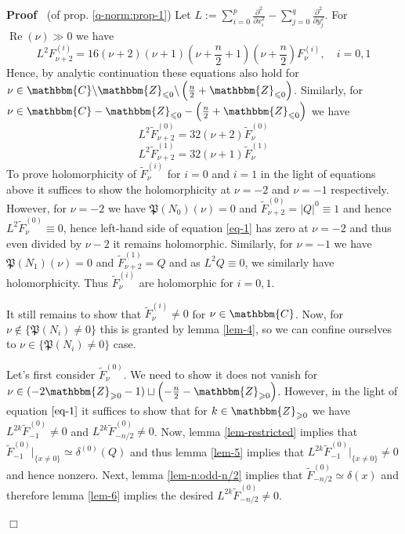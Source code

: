 \documentclass{article}
\newcommand{\assign}{:=}
\newcommand{\nin}{\not\in}
\newcommand{\tmop}[1]{\ensuremath{\operatorname{#1}}}
\newenvironment{proof}{\noindent\textbf{Proof\ }}{\hspace*{\fill}$\Box$\medskip}
\numberwithin{definition}{section}
\numberwithin{lemma}{section}
\numberwithin{proposition}{section}
{\theorembodyfont{\rmfamily}\newtheorem{remark}{Remark}
\numberwithin{remark}{section}
}
\begin{document}
\begin{proof}
  (of prop. \ref{q-norm:prop-1}) Let $L \assign \sum_{i = 0}^p
  \frac{\partial^2}{\partial x_i^2} - \sum_{j = 0}^q
  \frac{\partial^2}{\partial y_j^2}$. For $\tmop{Re} ( \nu) \gg 0$ we have
  \[ L^2 F_{\nu + 2}^{( i)} = 16 ( \nu + 2) ( \nu + 1) \left( \nu +
     \frac{n}{2} + 1 \right) \left( \nu + \frac{n}{2} \right) F_{\nu}^{( i)},
     \hspace{1em} i = 0, 1 \]
  Hence, by analytic continuation these equations also hold for $\nu \in
  \mathbbm{C}\backslash\mathbbm{Z}_{\leqslant 0} \backslash \left( \frac{n}{2}
  +\mathbbm{Z}_{\leqslant 0} \right)$. Similarly, for $\nu \in
  \mathbbm{C}-\mathbbm{Z}_{\leqslant 0} - \left( \frac{n}{2}
  +\mathbbm{Z}_{\leqslant 0} \right)$ we have
  \begin{equation}
    L^2 \tilde{F}^{( 0)}_{\nu + 2} = 32 ( \nu + 2) \tilde{F}_{\nu}^{( 0)}
    \label{eq-1}
  \end{equation}
  \begin{equation}
    L^2 \tilde{F}^{( 1)}_{\nu + 2} = 32 ( \nu + 1) \tilde{F}_{\nu}^{( 1)}
    \label{eq-2}
  \end{equation}
  To prove holomorphicity of $\tilde{F}_{\nu}^{( i)}$ for $i = 0$ and $i = 1$
  in the light of equations above it suffices to show the holomorphicity at
  $\nu = - 2$ and $\nu = - 1$ respectively. However, for $\nu = - 2$ we have
  $\mathfrak{P} ( N_0) ( \nu) = 0$ and $\tilde{F}_{\nu + 2}^{( 0)} = | Q |^0
  \equiv 1$ and hence $L^2 \tilde{F}^{( 0)}_{\nu} \equiv 0$, hence left-hand
  side of equation \ref{eq-1} has zero at $\nu = - 2$ and thus even divided by
  $\nu - 2$ it remains holomorphic. Similarly, for $\nu = - 1$ we have
  $\mathfrak{P} ( N_1) ( \nu) = 0$ and $\tilde{F}_{\nu + 2}^{( 1)} = Q$ and as
  $L^2 Q \equiv 0$, we similarly have holomorphicity. Thus $\tilde{F}_{\nu}^{(
  i)}$ are holomorphic for $i = 0, 1$.
  
  It still remains to show that $\tilde{F}^{( i)}_{\nu} \neq 0$ for $\nu \in
  \mathbbm{C}$. Now, for $\nu \nin \{ \mathfrak{P} ( N_i) \neq 0 \}$ this is
  granted by lemma \ref{lem-4}, so we can confine ourselves to $\nu \in \{
  \mathfrak{P} ( N_i) \neq 0 \}$ case.
  
  Let's first consider $\tilde{F}_{\nu}^{( 0)}$. We need to show it does not
  vanish for $\nu \in ( - 2\mathbbm{Z}_{\geqslant 0} - 1) \sqcup \left( -
  \frac{n}{2} -\mathbbm{Z}_{\geqslant 0} \right)$. However, in the light of
  equation $\ref{eq-1}$ it suffices to show that for $k \in
  \mathbbm{Z}_{\geqslant 0}$ we have $L^{2 k} \tilde{F}_{- 1}^{( 0)} \neq 0$
  and $L^{2 k} \tilde{F}_{- n / 2}^{( 0)} \neq 0$. Now, lemma
  \ref{lem-restricted} implies that $\tilde{F}_{- 1}^{( 0)} |_{\{ x \neq 0 \}}
  \simeq \delta^{( 0)} ( Q)$ and thus lemma \ref{lem-5} implies that $L^{2 k}
  \tilde{F}_{- 1}^{( 0)} |_{\{ x \neq 0 \}} \neq 0$ and hence nonzero. Next,
  lemma \ref{lem-n:odd-n/2} implies that $\tilde{F}_{- n / 2}^{( 0)} \simeq
  \delta ( x)$ and therefore lemma \ref{lem-6} implies the desired $L^{2 k}
  \tilde{F}_{- n / 2}^{( 0)} \neq 0$.
  

\end{proof}
\end{document}
